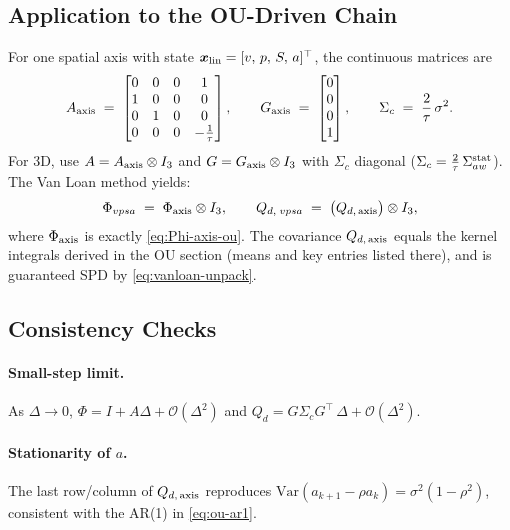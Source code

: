 \documentclass[10pt]{extarticle}
\begin{document}
\subsection{Application to the OU-Driven Chain}
For one spatial axis with state $\bm x_{\rm lin}=[v,\,p,\,S,\,a]^\top$, the continuous matrices are
\begin{equation}
A_{\rm axis} \;=\;
\begin{bmatrix}
0 & 0 & 0 & 1\\
1 & 0 & 0 & 0\\
0 & 1 & 0 & 0\\
0 & 0 & 0 & -\tfrac{1}{\tau}
\end{bmatrix},
\qquad
G_{\rm axis} \;=\;
\begin{bmatrix}0\\0\\0\\1\end{bmatrix},
\qquad
\Sigma_c \;=\; \frac{2}{\tau}\,\sigma^2.
\label{eq:Aaxis-Gaxis}
\end{equation}
For 3D, use $A = A_{\rm axis}\otimes I_3$ and $G=G_{\rm axis}\otimes I_3$ with $\Sigma_c$ diagonal
($\Sigma_c = \tfrac{2}{\tau}\,\Sigma_{aw}^{\rm stat}$). The Van Loan method yields:
\begin{equation}
\Phi_{vpsa} \;=\; \Phi_{\rm axis}\otimes I_3,
\qquad
Q_{d,\;vpsa} \;=\; \big(Q_{d,\,\rm axis}\big)\otimes I_3,
\label{eq:axis-3d}
\end{equation}
where $\Phi_{\rm axis}$ is exactly \eqref{eq:Phi-axis-ou}. The covariance $Q_{d,\,\rm axis}$ equals the kernel integrals
derived in the OU section (means and key entries listed there), and is guaranteed SPD by \eqref{eq:vanloan-unpack}.

\subsection{Consistency Checks}
\paragraph{Small-step limit.} As $\Delta\to 0$, $\Phi=I+A\Delta+\mathcal{O}(\Delta^2)$ and $Q_d=G\Sigma_c G^\top\,\Delta+\mathcal{O}(\Delta^2)$.
\paragraph{Stationarity of $a$.} The last row/column of $Q_{d,\,\rm axis}$ reproduces $\mathrm{Var}(a_{k+1}-\rho a_k)=\sigma^2(1-\rho^2)$,
consistent with the AR(1) in \eqref{eq:ou-ar1}.
\end{document}
